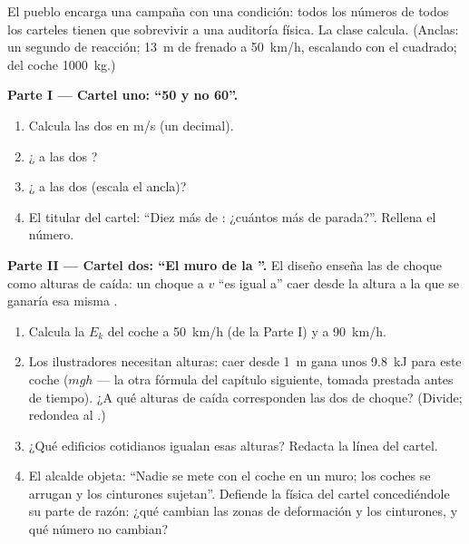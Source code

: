 \begin{problem}\label{pb:g9:kinetic-energy-safety:1}
El pueblo encarga una campaña con una condición: todos los números de
todos los carteles tienen que sobrevivir a una auditoría física. La
clase calcula. (Anclas: un segundo de reacción; \qty{13}{m} de frenado
a \qty{50}{km/h}, escalando con el cuadrado;  del coche
\qty{1000}{kg}.)

\medskip\noindent\textbf{Parte I --- Cartel uno: ``50 y no 60''.}
\begin{enumerate}
  \item Calcula las dos  en \unit{m/s} (un decimal).
  \item ¿ a las dos
        ?
  \item ¿ a las dos (escala el ancla)?
  \item El titular del cartel: ``Diez  más de
        : ¿cuántos  más de parada?''. Rellena
        el número.
\end{enumerate}

\medskip\noindent\textbf{Parte II --- Cartel dos: ``El muro de la
''.}
El diseño enseña las  de choque como alturas de caída: un
choque a  $v$ ``es igual a'' caer desde la altura a la que
se ganaría esa misma .
\begin{enumerate}[resume]
  \item Calcula la $E_k$ del coche a \qty{50}{km/h} (de la Parte I)
        y a \qty{90}{km/h}.
  \item Los ilustradores necesitan alturas: caer desde \qty{1}{m}
        gana unos \qty{9.8}{kJ} para este coche ($m g h$ --- la otra
        fórmula del capítulo siguiente, tomada prestada antes de
        tiempo). ¿A qué alturas de caída corresponden las dos
         de choque? (Divide; redondea al .)
  \item ¿Qué edificios cotidianos igualan esas alturas? Redacta la
        línea del cartel.
  \item El alcalde objeta: ``Nadie se mete con el coche en un muro;
        los coches se arrugan y los cinturones sujetan''. Defiende
        la física del cartel concediéndole su parte de razón: ¿qué
        cambian las zonas de deformación y los cinturones, y qué
        número no cambian?
\end{enumerate}


\end{problem}
